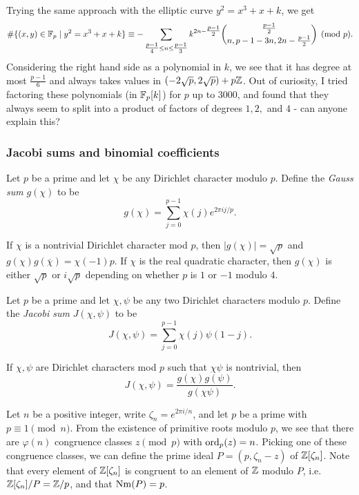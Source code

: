 \begin{rem} Trying the same approach with the elliptic curve $y^2 = x^3+x+k$, we get
\[
\#\{(x,y)\in\mathbb{F}_p\mid y^2=x^3+x+k\} \equiv -\sum_{\tfrac{p-1}{4}\le n\le\tfrac{p-1}{3}} k^{2n-\tfrac{p-1}{2}}\binom{\tfrac{p-1}{2}}{n,p-1-3n,2n-\tfrac{p-1}{2}}\pmod{p}.
\]
Considering the right hand side as a polynomial in $k$, we see that it has degree at most $\frac{p-1}{6}$ and always takes values in $(-2\sqrt{p},2\sqrt{p}) + p\mathbb{Z}$. Out of curiosity, I tried factoring these polynomials (in $\mathbb{F}_p[k]$) for $p$ up to $3000$, and found that they always seem to split into a product of factors of degrees $1,2,$ and $4$ - can anyone explain this?
\end{rem}

\subsubsection{Jacobi sums and binomial coefficients}

\begin{defn} Let $p$ be a prime and let $\chi$ be any Dirichlet character modulo $p$. Define the \emph{Gauss sum} $g(\chi)$ to be
\[
g(\chi) = \sum_{j=0}^{p-1} \chi(j)e^{2\pi ij/p}.
\]
\end{defn}

\begin{prop} If $\chi$ is a nontrivial Dirichlet character mod $p$, then $|g(\chi)| = \sqrt{p}$ and $g(\chi)g(\overline{\chi}) = \chi(-1)p$. If $\chi$ is the real quadratic character, then $g(\chi)$ is either $\sqrt{p}$ or $i\sqrt{p}$ depending on whether $p$ is $1$ or $-1$ modulo $4$.
\end{prop}

\begin{defn} Let $p$ be a prime and let $\chi, \psi$ be any two Dirichlet characters modulo $p$. Define the \emph{Jacobi sum} $J(\chi, \psi)$ to be
\[
J(\chi,\psi) = \sum_{j=0}^{p-1} \chi(j)\psi(1-j).
\]
\end{defn}

\begin{prop} If $\chi, \psi$ are Dirichlet characters mod $p$ such that $\chi\psi$ is nontrivial, then
\[
J(\chi,\psi) = \frac{g(\chi)g(\psi)}{g(\chi\psi)}.
\]
\end{prop}

Let $n$ be a positive integer, write $\zeta_n = e^{2\pi i/n}$, and let $p$ be a prime with $p \equiv 1 \pmod{n}$. From the existence of primitive roots modulo $p$, we see that there are $\varphi(n)$ congruence classes $z \pmod{p}$ with $\operatorname{ord}_p(z) = n$. Picking one of these congruence classes, we can define the prime ideal $P = (p,\zeta_n-z)$ of $\mathbb{Z}[\zeta_n]$. Note that every element of $\mathbb{Z}[\zeta_n]$ is congruent to an element of $\mathbb{Z}$ modulo $P$, i.e. $\mathbb{Z}[\zeta_n]/P = \mathbb{Z}/p$, and that $\operatorname{Nm}(P) = p$.

